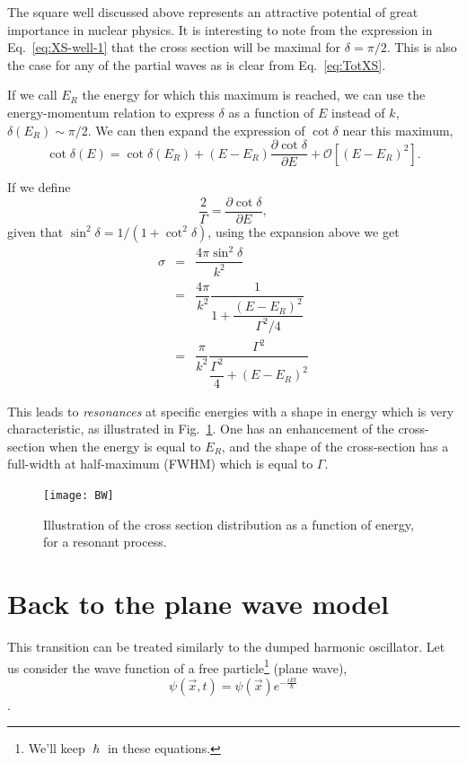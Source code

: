 The square well discussed above represents an attractive potential of great importance in nuclear physics. It is interesting to note from the expression in Eq.~\eqref{eq:XS-well-1} that the cross section will be maximal for $\delta = \pi/2$. This is also the case for any of the partial waves as is clear from Eq.~\eqref{eq:TotXS}. 

If we call $E_R$ the energy for which this maximum is reached, we can use the energy-momentum relation to express  $\delta$ as a function of $E$ instead of $k$, $\delta(E_R) \sim \pi/2$. We can then expand the expression of $\cot \delta$ near this maximum,
\[\cot \delta(E) = \cot \delta(E_R) + (E- E_R) \dfrac{\partial \cot \delta}{\partial E} + \mathcal{O}[(E- E_R)^2].\]

If we define
\[ \frac{2}{\Gamma} = \dfrac{\partial \cot \delta}{\partial E},\]
given that $\sin^2 \delta = 1/(1+ \cot^2 \delta)$, using the expansion above we get
\begin{eqnarray}
\label{eq:BW}
  \sigma & = & \dfrac{ 4 \pi \sin^2 \delta}{k^2} \nonumber \\
  & = & \dfrac{4 \pi}{k^2} \dfrac{1}{1+\dfrac{(E-E_R)^2}{\Gamma^2/4}} \nonumber \\
  & = & \dfrac{\pi}{k^2} \dfrac{\Gamma^2}{\dfrac{\Gamma^2}{4}+(E-E_R)^2}
\end{eqnarray}

This leads to \emph{resonances} at specific energies with a shape in energy which is very characteristic, as illustrated in Fig.~\ref{fig:BW}. One has an enhancement of the cross-section when the energy is equal to $E_R$, and the shape of the cross-section has a full-width at half-maximum (FWHM) which is equal to $\Gamma$.


\begin{figure}
  \centering
  \texttt{[image: BW]}
\caption{Illustration of the cross section distribution as a function of energy, for a resonant process.}  \label{fig:BW}
\end{figure}

\section{Back to the plane wave model}
This transition can be treated similarly to the
dumped harmonic oscillator. Let us consider the wave function of a free
particle\footnote{We'll keep $\hslash$ in these equations.} (plane wave),
\[\psi(\vec{x},t) = \psi(\vec{x})e^{-\frac{iEt}{\hslash}}\].

